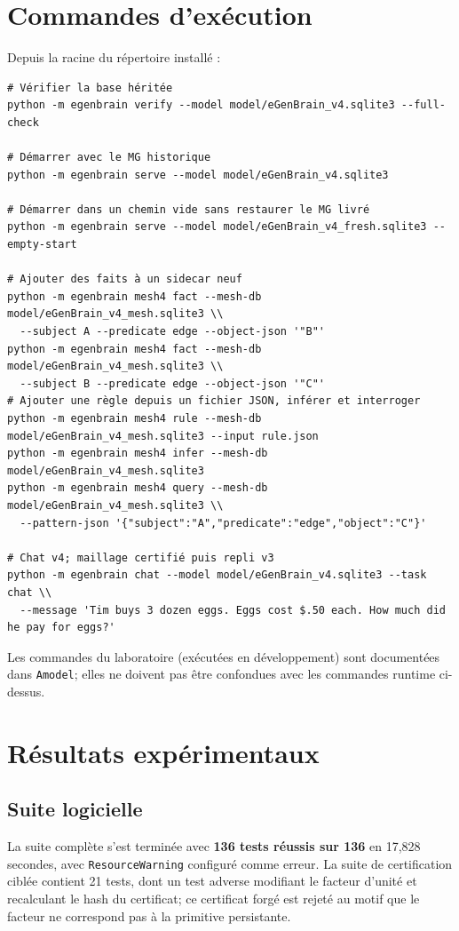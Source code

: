 \documentclass[11pt,a4paper]{book}
\begin{document}
\chapter{Commandes d'exécution}
Depuis la racine du répertoire installé :
\begin{verbatim}
# Vérifier la base héritée
python -m egenbrain verify --model model/eGenBrain_v4.sqlite3 --full-check

# Démarrer avec le MG historique
python -m egenbrain serve --model model/eGenBrain_v4.sqlite3

# Démarrer dans un chemin vide sans restaurer le MG livré
python -m egenbrain serve --model model/eGenBrain_v4_fresh.sqlite3 --empty-start

# Ajouter des faits à un sidecar neuf
python -m egenbrain mesh4 fact --mesh-db model/eGenBrain_v4_mesh.sqlite3 \\
  --subject A --predicate edge --object-json '"B"'
python -m egenbrain mesh4 fact --mesh-db model/eGenBrain_v4_mesh.sqlite3 \\
  --subject B --predicate edge --object-json '"C"'
# Ajouter une règle depuis un fichier JSON, inférer et interroger
python -m egenbrain mesh4 rule --mesh-db model/eGenBrain_v4_mesh.sqlite3 --input rule.json
python -m egenbrain mesh4 infer --mesh-db model/eGenBrain_v4_mesh.sqlite3
python -m egenbrain mesh4 query --mesh-db model/eGenBrain_v4_mesh.sqlite3 \\
  --pattern-json '{"subject":"A","predicate":"edge","object":"C"}'

# Chat v4; maillage certifié puis repli v3
python -m egenbrain chat --model model/eGenBrain_v4.sqlite3 --task chat \\
  --message 'Tim buys 3 dozen eggs. Eggs cost $.50 each. How much did he pay for eggs?'
\end{verbatim}
Les commandes du laboratoire (exécutées en développement) sont documentées dans \texttt{Amodel}; elles ne doivent pas être confondues avec les commandes runtime ci-dessus.

\chapter{Résultats expérimentaux}
\section{Suite logicielle}
La suite complète s'est terminée avec \textbf{136 tests réussis sur 136} en 17,828 secondes, avec \texttt{ResourceWarning} configuré comme erreur. La suite de certification ciblée contient 21 tests, dont un test adverse modifiant le facteur d'unité et recalculant le hash du certificat; ce certificat forgé est rejeté au motif que le facteur ne correspond pas à la primitive persistante.
\end{document}
